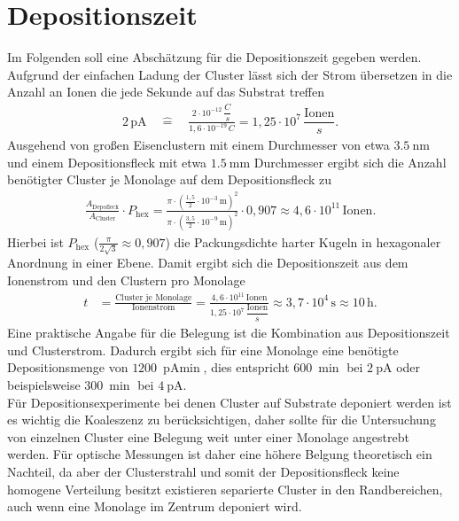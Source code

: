 \section{Depositionszeit}
\label{sec:depo}
Im Folgenden soll eine Abschätzung für die Depositionszeit gegeben werden.
Aufgrund der einfachen Ladung der Cluster lässt sich der Strom übersetzen in die Anzahl an Ionen die jede Sekunde auf das Substrat treffen
\begin{align}
  2\,\text{pA} \quad \widehat{=} \quad \frac{2\cdot10^{-12}\,\dfrac{C}{s}}{1,6\cdot10^{-19}\,C} = 1,25\cdot10^7 \,\dfrac{\text{Ionen}}{s}.
\end{align}
Ausgehend von großen Eisenclustern mit einem Durchmesser von etwa $\SI{3,5}{\nano\meter}$ und einem Depositionsfleck mit etwa $\SI{1,5}{\milli\meter}$ Durchmesser ergibt sich die Anzahl benötigter Cluster je Monolage auf dem Depositionsfleck zu
\begin{align}
  \frac{A_{\text{Depofleck}}}{A_{\text{Cluster}}}\cdot P_{\text{hex}} =\frac{\pi\cdot(\frac{1,5}{2}\cdot10^{-3}\,\text{m})^2}{\pi\cdot(\frac{3,5}{2}\cdot10^{-9}\,\text{m})^2}\cdot 0,907\approx 4,6\cdot10^{11} \,\text{Ionen}.
\end{align}
Hierbei ist $P_{\text{hex}}$ ($\frac{\pi}{2 \sqrt{3}} \approx 0,907$) die Packungsdichte harter Kugeln in hexagonaler Anordnung in einer Ebene.
Damit ergibt sich die Depositionszeit aus dem Ionenstrom und den Clustern pro Monolage
\begin{align}
  t&=\frac{\text{Cluster je Monolage}}{\text{Ionenstrom}}=\frac{4,6\cdot10^{11} \,\text{Ionen}}{1,25\cdot10^7 \,\dfrac{\text{Ionen}}{s}}\approx 3,7 \cdot10^4\,\text{s} \approx 10\,\text{h}.
\end{align}
Eine praktische Angabe für die Belegung ist die Kombination aus Depositionszeit und Clusterstrom.
Dadurch ergibt sich für eine Monolage eine benötigte Depositionsmenge von $\SI{1200}{\pA\min}$, dies entspricht $\SI{600}{\min}$ bei $\SI{2}{\pA}$ oder beispielsweise $\SI{300}{\min}$ bei $\SI{4}{\pA}$.\\

Für Depositionsexperimente bei denen Cluster auf Substrate deponiert werden ist es wichtig die Koaleszenz zu berücksichtigen, daher sollte für die Untersuchung von einzelnen Cluster eine Belegung weit unter einer Monolage angestrebt werden.
Für optische Messungen ist daher eine höhere Belgung theoretisch ein Nachteil, da aber der Clusterstrahl und somit der Depositionsfleck keine homogene Verteilung besitzt existieren separierte Cluster in den Randbereichen, auch wenn eine Monolage im Zentrum deponiert wird.


